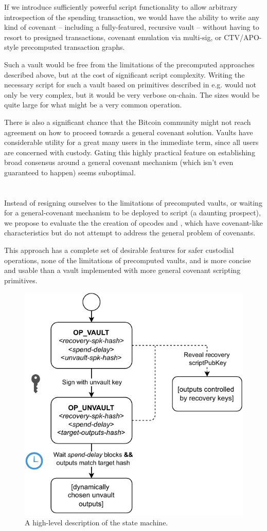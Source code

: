\documentclass[10pt]{article}
\begin{document}
If we introduce sufficiently powerful script functionality to allow arbitrary
introspection of the spending transaction, we would have the ability to write any kind
of covenant -- including a fully-featured, recursive vault -- without having to resort
to presigned transactions, covenant emulation via multi-sig, or CTV/APO-style precomputed
transaction graphs.

Such a vault would be free from the limitations of the precomputed approaches described
above, but at the cost of significant script complexity. Writing the necessary script
for such a vault based on primitives described in e.g. \cite{ElementsScript} would not
only be very complex, but it would be very verbose on-chain. The \spk{} sizes would be
quite large for what might be a very common operation.

There is also a significant chance that the Bitcoin community might not reach agreement
on how to proceed towards a general covenant solution. Vaults have considerable utility
for a great many users in the immediate term, since all users are concerned
with custody. Gating this highly practical feature on establishing broad consensus
around a general covenant mechanism (which isn't even guaranteed to happen) seems
suboptimal.

\section*{\opv{}}

Instead of resigning ourselves to the limitations of precomputed vaults, or waiting for
a general-covenant mechanism to be deployed to script (a daunting prospect), we propose
to evaluate the the creation of opcodes \opv{} and \opuv{}, which have covenant-like
characteristics but do not attempt to address the general problem of covenants.

This approach has a complete set of desirable features for safer custodial operations,
none of the limitations of precomputed vaults, and is more concise and usable than a
vault implemented with more general covenant scripting primitives.

\begin{figure}[H]
  \includegraphics[width=0.5\linewidth]{op-vault.pdf}
  \centering
  \caption{A high-level description of the \opv{} state machine.}
\end{figure}
\end{document}
